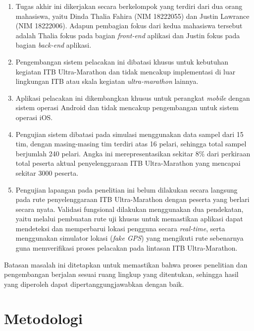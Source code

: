 \begin{enumerate}
    \item Tugas akhir ini dikerjakan secara berkelompok yang terdiri dari dua orang mahasiswa, yaitu Dinda Thalia Fahira (NIM 18222055) dan Justin Lawrance (NIM 18222006). Adapun pembagian fokus dari kedua mahasiswa tersebut adalah Thalia fokus pada bagian \textit{front-end} aplikasi dan Justin fokus pada bagian \textit{back-end} aplikasi.
    \item Pengembangan sistem pelacakan ini dibatasi khusus untuk kebutuhan kegiatan ITB Ultra-Marathon dan tidak mencakup implementasi di luar lingkungan ITB atau skala kegiatan \textit{ultra-marathon} lainnya.
    \item Aplikasi pelacakan ini dikembangkan khusus untuk perangkat \textit{mobile} dengan sistem operasi Android dan tidak mencakup pengembangan untuk sistem operasi iOS.
    \item Pengujian sistem dibatasi pada simulasi menggunakan data sampel dari 15 tim, dengan masing-masing tim terdiri atas 16 pelari, sehingga total sampel berjumlah 240 pelari. Angka ini merepresentasikan sekitar 8\% dari perkiraan total peserta aktual penyelenggaraan ITB Ultra-Marathon yang mencapai sekitar 3000 peserta.
    \item Pengujian lapangan pada penelitian ini belum dilakukan secara langsung pada rute penyelenggaraan ITB Ultra-Marathon dengan peserta yang berlari secara nyata. Validasi fungsional dilakukan menggunakan dua pendekatan, yaitu melalui pembuatan rute uji khusus untuk memastikan aplikasi dapat mendeteksi dan memperbarui lokasi pengguna secara \textit{real-time}, serta menggunakan simulator lokasi (\textit{fake GPS}) yang mengikuti rute sebenarnya guna memverifikasi proses pelacakan pada lintasan ITB Ultra-Marathon. 
\end{enumerate}

Batasan masalah ini ditetapkan untuk memastikan bahwa proses penelitian dan pengembangan berjalan sesuai ruang lingkup yang ditentukan, sehingga hasil yang diperoleh dapat dipertanggungjawabkan dengan baik.
\section{Metodologi}

